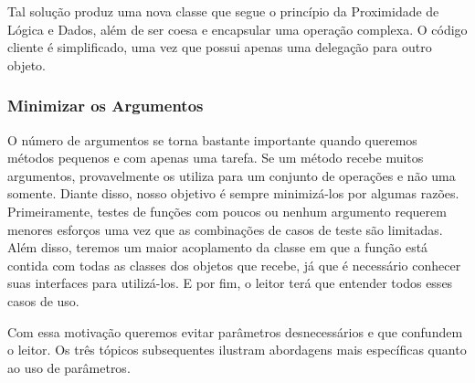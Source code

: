 Tal solução produz uma nova classe que segue o princípio da Proximidade de Lógica e Dados, além de ser coesa e encapsular uma operação complexa. O código cliente 
é simplificado, uma vez que possui apenas uma delegação para outro objeto.

\subsubsection{Minimizar os Argumentos}
O número de argumentos se torna bastante importante quando queremos métodos pequenos e com apenas uma tarefa. Se um método recebe muitos argumentos, provavelmente os utiliza para um conjunto de operações e não uma somente. Diante disso, nosso objetivo é sempre minimizá-los por algumas razões. Primeiramente, testes de funções com poucos ou nenhum argumento requerem menores esforços  uma vez que as combinações de casos de teste são limitadas. Além disso, teremos um maior acoplamento da classe em que a função está contida com todas as classes dos objetos que recebe, já que é necessário conhecer suas interfaces para utilizá-los. E por fim, o leitor terá que entender todos esses casos de uso.

Com essa motivação queremos evitar parâmetros desnecessários e que confundem o leitor. Os três tópicos subsequentes ilustram abordagens mais específicas quanto ao uso de parâmetros.

